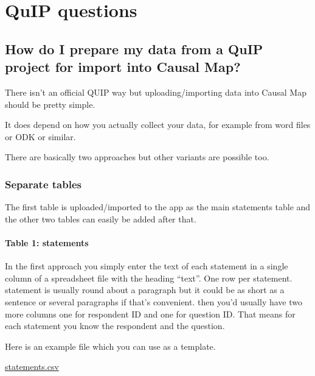 \documentclass[
]{book}
\begin{document}
\hypertarget{quip-questions}{%
\section{QuIP questions}\label{quip-questions}}

\hypertarget{how-do-i-prepare-my-data-from-a-quip-project-for-import-into-causal-map}{%
\subsection{How do I prepare my data from a QuIP project for import into Causal Map?}\label{how-do-i-prepare-my-data-from-a-quip-project-for-import-into-causal-map}}

There isn't an official QUIP way but uploading/importing data into Causal Map should be pretty simple.

It does depend on how you actually collect your data, for example from word files or ODK or similar.

There are basically two approaches but other variants are possible too.

\hypertarget{separate-tables}{%
\subsubsection{Separate tables}\label{separate-tables}}

The first table is uploaded/imported to the app as the main statements table and the other two tables can easily be added after that.

\hypertarget{table-1-statements}{%
\paragraph{Table 1: statements}\label{table-1-statements}}

In the first approach you simply enter the text of each statement in a single column of a spreadsheet file with the heading ``text''. One row per statement. statement is usually round about a paragraph but it could be as short as a sentence or several paragraphs if that's convenient. then you'd usually have two more columns one for respondent ID and one for question ID. That means for each statement you know the respondent and the question.

Here is an example file which you can use as a template.

\href{https://drive.google.com/file/d/18R64W4JH4d0u7Vi3qBHC12oLcnJk_Gam/view?usp=drive_web}{statements.csv}
\end{document}
